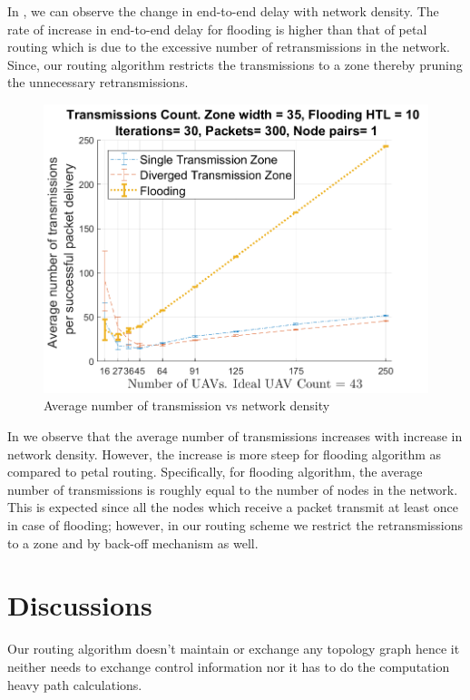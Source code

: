 In , we can observe the change in end-to-end delay with network density. The rate of increase in end-to-end delay for flooding is higher than that of petal routing which is due to the excessive number of retransmissions in the network. Since, our routing algorithm restricts the transmissions to a zone thereby pruning the unnecessary retransmissions.  

\begin{figure}[hbtp]
\centering
\includegraphics[width=1\textwidth]{ncsuthesis-0.6/Chapter-5/figs/ND_trans}
\caption{Average number of transmission vs network density}
\label{fig:ND_trans}
\end{figure}

In  we observe that the average number of transmissions increases with increase in network density. However, the increase is more steep for flooding algorithm as compared to petal routing. Specifically, for flooding algorithm, the average number of transmissions is roughly equal to the number of nodes in the network. This is expected since all the nodes which receive a packet transmit at least once in case of flooding; however, in our routing scheme we restrict the retransmissions to a zone and by back-off mechanism as well.

\section{Discussions}

Our routing algorithm doesn't maintain or exchange any topology graph hence it neither needs to exchange control information nor it has to do the computation heavy path calculations.

